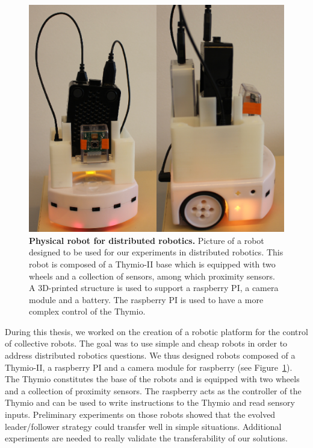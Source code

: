	    \begin{figure}[hbt]
	        \begin{center}
	          \includegraphics[scale = 0.50]{fig/Discussion/Robot.png}
	          \caption{\textbf{Physical robot for distributed robotics.}
	          Picture of a robot designed to be used for our experiments in distributed robotics. This robot is composed of a Thymio-II base which is equipped with two wheels and a collection of sensors, among which proximity sensors. A 3D-printed structure is used to support a raspberry PI, a camera module and a battery. The raspberry PI is used to have a more complex control of the Thymio.} 
	          \label{fig:thymioPicture}
	        \end{center}
	    \end{figure}

			During this thesis, we worked on the creation of a robotic platform for the control of collective robots. The goal was to use simple and cheap robots in order to address distributed robotics questions. We thus designed robots composed of a Thymio-II, a raspberry PI and a camera module for raspberry (see Figure~\ref{fig:thymioPicture}). The Thymio constitutes the base of the robots and is equipped with two wheels and a collection of proximity sensors. The raspberry acts as the controller of the Thymio and can be used to write instructions to the Thymio and read sensory inputs. Preliminary experiments on those robots showed that the evolved leader/follower strategy could transfer well in simple situations. Additional experiments are needed to really validate the transferability of our solutions.

